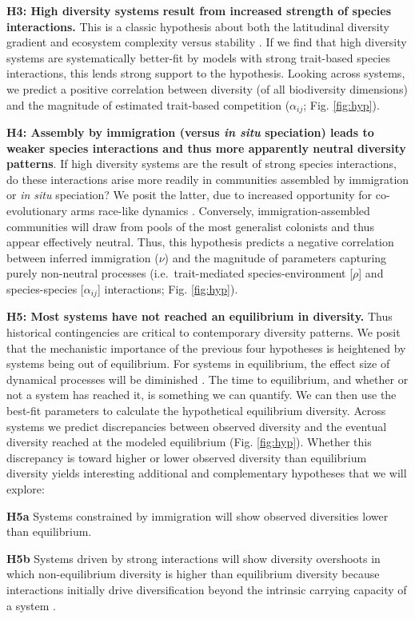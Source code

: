\documentclass[11pt]{article}
\begin{document}
\textbf{H3: High diversity systems result from increased strength of
  species interactions.} This is a classic hypothesis about both the
latitudinal diversity gradient \cite{Pianka1966-ky} and ecosystem
complexity versus stability \cite{May1973-ua, Nuismer2013-wd}. If we
find that high diversity systems are systematically better-fit by
models with strong trait-based species interactions, this lends strong
support to the hypothesis. Looking across systems, we predict a
positive correlation between diversity (of all biodiversity
dimensions) and the magnitude of estimated trait-based competition
($\alpha_{ij}$; Fig. \ref{fig:hyp}).

\textbf{H4: Assembly by immigration (versus \emph{in situ} speciation)
  leads to weaker species interactions and thus more apparently
  neutral diversity patterns}.  If high diversity systems are the
result of strong species interactions, do these interactions arise
more readily in communities assembled by immigration or \emph{in situ}
speciation? We posit the latter, due to increased opportunity for
co-evolutionary arms race-like dynamics \cite{Quental2013-qv,
  ODwyer2014-gw}. Conversely, immigration-assembled communities will
draw from pools of the most generalist colonists and thus appear
effectively neutral. Thus, this hypothesis predicts a negative
correlation between inferred immigration ($\nu$) and the magnitude of
parameters capturing purely non-neutral processes (i.e.~trait-mediated
species-environment {[}$\rho${]} and species-species
{[}$\alpha_{ij}${]} interactions; Fig.  \ref{fig:hyp}).

\textbf{H5: Most systems have not reached an equilibrium in
  diversity.}  Thus historical contingencies are critical to
contemporary diversity patterns. We posit that the mechanistic
importance of the previous four hypotheses is heightened by systems
being out of equilibrium. For systems in equilibrium, the effect size
of dynamical processes will be diminished \cite{Rabosky2009-gs}. The
time to equilibrium, and whether or not a system has reached it, is
something we can quantify. We can then use the best-fit parameters to
calculate the hypothetical equilibrium diversity. Across systems we
predict discrepancies between observed diversity and the eventual
diversity reached at the modeled equilibrium
(Fig. \ref{fig:hyp}). Whether this discrepancy is toward higher or
lower observed diversity than equilibrium diversity yields interesting
additional and complementary hypotheses that we will explore:

\begin{adjustwidth}{2.5em}{0pt}
\hspace{1.5em}\textbf{H5a} Systems constrained by immigration \citep[e.g.~arthropod
communities on young substrates in Hawaii;][]{Rominger2015-kb} will
show observed diversities lower than equilibrium.

\textbf{H5b} Systems driven by strong interactions will show diversity
overshoots in which non-equilibrium diversity is higher than equilibrium
diversity because interactions initially drive diversification beyond
the intrinsic carrying capacity of a system \cite{Gillespie2010-bv}.
\end{adjustwidth}
\end{document}
